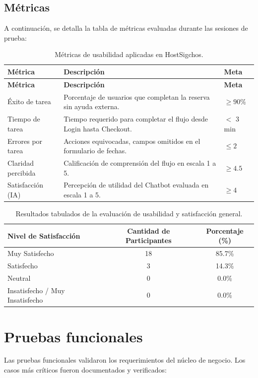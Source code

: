 \documentclass[12pt,letterpaper]{report}
\begin{document}
\subsection{Métricas}
A continuación, se detalla la tabla de métricas evaluadas durante las sesiones de prueba:

\begin{longtable}{p{4cm}p{8.5cm}p{2cm}}
\caption{Métricas de usabilidad aplicadas en HostSigchos.}\\
\toprule
\textbf{Métrica} & \textbf{Descripción} & \textbf{Meta}\\
\midrule
\endfirsthead
\toprule
\textbf{Métrica} & \textbf{Descripción} & \textbf{Meta}\\
\midrule
\endhead
Éxito de tarea & Porcentaje de usuarios que completan la reserva sin ayuda externa. & $\geq 90\%$\\
Tiempo de tarea & Tiempo requerido para completar el flujo desde Login hasta Checkout. & $<$ 3 min\\
Errores por tarea & Acciones equivocadas, campos omitidos en el formulario de fechas. & $\leq 2$\\
Claridad percibida & Calificación de comprensión del flujo en escala 1 a 5. & $\geq 4.5$\\
Satisfacción (IA) & Percepción de utilidad del Chatbot evaluada en escala 1 a 5. & $\geq 4$\\
\bottomrule
\end{longtable}

\begin{table}[H]
  \centering
  \caption{Resultados tabulados de la evaluación de usabilidad y satisfacción general.}
  \begin{tabular}{l c c}
    \toprule
    \textbf{Nivel de Satisfacción} & \textbf{Cantidad de Participantes} & \textbf{Porcentaje (\%)} \\
    \midrule
    Muy Satisfecho & 18 & 85.7\% \\
    Satisfecho & 3 & 14.3\% \\
    Neutral & 0 & 0.0\% \\
    Insatisfecho / Muy Insatisfecho & 0 & 0.0\% \\
    \bottomrule
  \end{tabular}
\end{table}

\section{Pruebas funcionales}
Las pruebas funcionales validaron los requerimientos del núcleo de negocio. Los casos más críticos fueron documentados y verificados:
\end{document}
